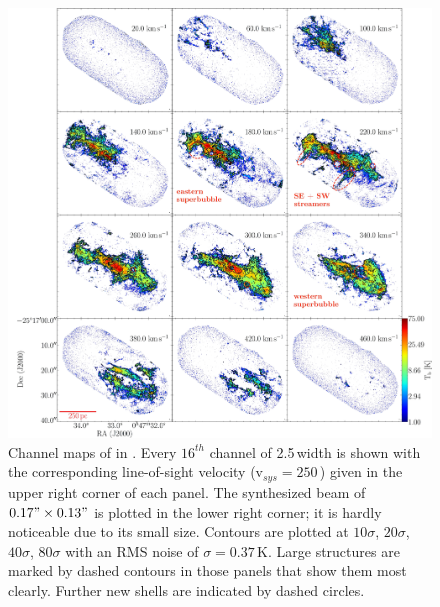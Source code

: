 \begin{figure}
	\centering
	\includegraphics[width=\linewidth]{images/chapters/papers/outflow/outflow_fig1.pdf}
	\caption[NGC253  channel map]{Channel maps of  in . Every $16^{th}$ channel of 2.5\,\kms width is shown with the corresponding line-of-sight velocity ($\mathrm{v}_{sys} = 250$\,\kms) given in the upper right corner of each panel. The synthesized beam of $0.17" \times 0.13"$ is plotted in the lower right corner; it is hardly noticeable due to its small size. Contours are plotted at $10\sigma$, $20\sigma$, $40\sigma$, $80\sigma$ with an RMS noise of $\sigma = 0.37$\,K. Large structures are marked by dashed contours in those panels that show them most clearly. Further new shells are indicated by dashed circles.}
	\label{outflow: figure: CO channel map}
\end{figure}

